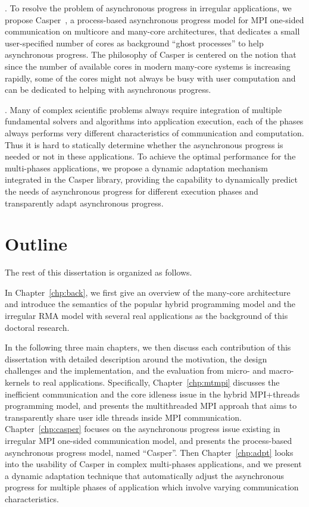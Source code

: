 .
To resolve the problem of asynchronous progress in irregular applications,
we propose Casper~\cite{casper}, a process-based asynchronous progress
model for MPI one-sided communication on multicore and many-core architectures,
that dedicates a small user-specified number of cores as background
``ghost processes'' to help asynchronous progress. The philosophy of
Casper is centered on the notion that since the number of available
cores in modern many-core systems is increasing rapidly, some of the
cores might not always be busy with user computation and can be dedicated
to helping with asynchronous progress.

.
Many of complex scientific problems always require integration of multiple
fundamental solvers and algorithms into application execution, each of
the phases always performs very different characteristics of communication
and computation. Thus it is hard to statically determine whether the asynchronous
progress is needed or not in these applications. To achieve the optimal
performance for the multi-phases applications, we propose a dynamic adaptation
mechanism integrated in the Casper library, providing the capability to
dynamically predict the needs of asynchronous progress for different
execution phases and transparently adapt asynchronous progress.


\section{Outline}

The rest of this dissertation is organized as follows.

In Chapter~\ref{chp:back}, we first give an overview of the many-core
architecture and introduce the semantics of the popular hybrid programming
model and the irregular RMA model with several real applications as the
background of this doctoral research.

In the following three main chapters, we then discuss each contribution
of this dissertation with detailed description around the motivation,
the design challenges and the implementation, and the evaluation from
micro- and macro-kernels to real applications. Specifically,
Chapter~\ref{chp:mtmpi} discusses the inefficient communication and
the core idleness issue in the hybrid MPI+threads programming model,
and presents the multithreaded MPI approah that aims to transparently
share user idle threads inside MPI communication.
Chapter~\ref{chp:casper} focuses on the asynchronous progress issue existing
in irregular MPI one-sided communication model, and presents the process-based
asynchronous progress model, named ``Casper''. Then Chapter~\ref{chp:adpt}
looks into the usability of Casper in complex multi-phases applications,
and we present a dynamic adaptation technique that automatically adjust
the asynchronous progress for multiple phases of application which involve
varying communication characteristics.

